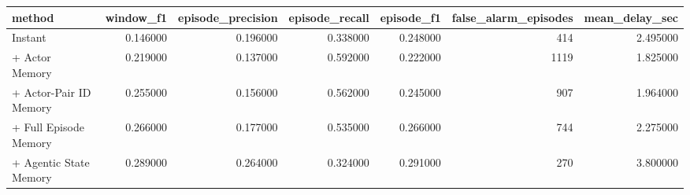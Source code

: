 \begin{tabular}{lrrrrrr}
\toprule
method & window\_f1 & episode\_precision & episode\_recall & episode\_f1 & false\_alarm\_episodes & mean\_delay\_sec \\
\midrule
Instant & 0.146000 & 0.196000 & 0.338000 & 0.248000 & 414 & 2.495000 \\
+ Actor Memory & 0.219000 & 0.137000 & 0.592000 & 0.222000 & 1119 & 1.825000 \\
+ Actor-Pair ID Memory & 0.255000 & 0.156000 & 0.562000 & 0.245000 & 907 & 1.964000 \\
+ Full Episode Memory & 0.266000 & 0.177000 & 0.535000 & 0.266000 & 744 & 2.275000 \\
+ Agentic State Memory & 0.289000 & 0.264000 & 0.324000 & 0.291000 & 270 & 3.800000 \\
\bottomrule
\end{tabular}
